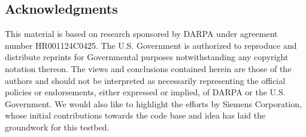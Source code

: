 \subsection*{Acknowledgments}
This material is based on research sponsored by DARPA under agreement number HR001124C0425. The U.S. Government is authorized to reproduce and distribute reprints for Governmental purposes notwithstanding any copyright notation thereon. The views and conclusions contained herein are those of the authors and should not be interpreted as necessarily representing the official policies or endorsements, either expressed or implied, of DARPA or the U.S. Government. We would also like to highlight the efforts by Siemens Corporation, whose initial contributions towards the code base and idea has laid the groundwork for this testbed.
